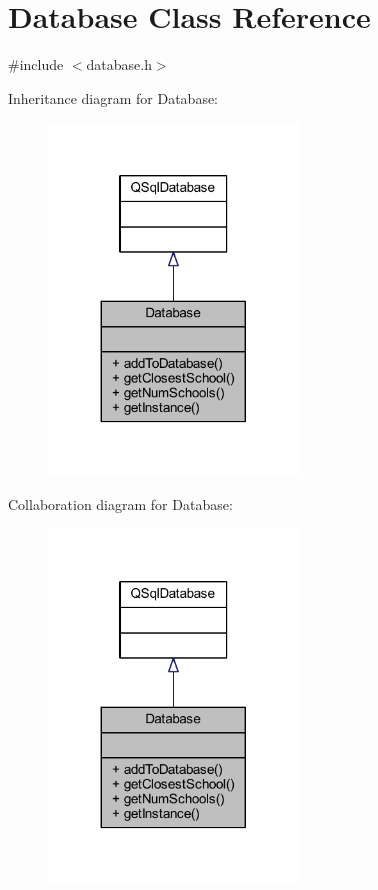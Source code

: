 \hypertarget{class_database}{}\section{Database Class Reference}
\label{class_database}


{\ttfamily \#include $<$database.\+h$>$}



Inheritance diagram for Database\+:\nopagebreak
\begin{figure}[H]
\begin{center}
\leavevmode
\includegraphics[width=188pt]{class_database__inherit__graph}
\end{center}
\end{figure}


Collaboration diagram for Database\+:\nopagebreak
\begin{figure}[H]
\begin{center}
\leavevmode
\includegraphics[width=188pt]{class_database__coll__graph}
\end{center}
\end{figure}

